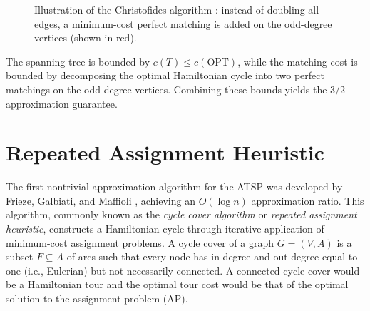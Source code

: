 \documentclass[12pt]{report}
\theoremstyle{definition}
\begin{document}
\begin{figure}[htbp]
    \centering
    \caption{Illustration of the Christofides algorithm \cite{traub}: instead of doubling all edges, a minimum-cost perfect matching is added on the odd-degree vertices (shown in red).}
    \label{fig:christofides}
\end{figure}
The spanning tree is bounded by $c(T) \leq c(\mathrm{OPT})$, while the matching cost is bounded by decomposing the optimal Hamiltonian cycle into two perfect matchings on the odd-degree vertices. Combining these bounds yields the 3/2-approximation guarantee.

\section{Repeated Assignment Heuristic}
\label{RA_heuristic}
The first nontrivial approximation algorithm for the ATSP was developed by Frieze, Galbiati, and Maffioli \cite{frieze1982}, achieving an $O(\log n)$ approximation ratio. This algorithm, commonly known as the \emph{cycle cover algorithm} or \emph{repeated assignment heuristic}, constructs a Hamiltonian cycle through iterative application of minimum-cost assignment problems. A cycle cover of a graph $G=(V,A)$ is a subset $F \subseteq A$ of arcs such that every node has in-degree and out-degree equal to one (i.e., Eulerian) but not necessarily connected. A connected cycle cover would be a Hamiltonian tour and the optimal tour cost would be that of the optimal solution to the assignment problem (AP).
\end{document}
